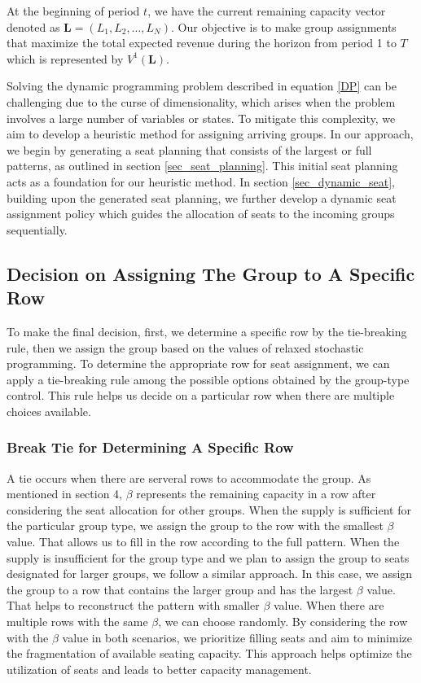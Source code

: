 At the beginning of period $t$, we have the current remaining capacity vector denoted as $\mathbf{L} = (L_1, L_2, \ldots, L_N)$. Our objective is to make group assignments that maximize the total expected revenue during the horizon from period 1 to $T$ which is represented by $V^{1}(\mathbf{L})$.

Solving the dynamic programming problem described in equation \eqref{DP} can be challenging due to the curse of dimensionality, which arises when the problem involves a large number of variables or states. To mitigate this complexity, we aim to develop a heuristic method for assigning arriving groups. In our approach, we begin by generating a seat planning that consists of the largest or full patterns, as outlined in section \ref{sec_seat_planning}. This initial seat planning acts as a foundation for our heuristic method. In section \ref{sec_dynamic_seat}, building upon the generated seat planning, we further develop a dynamic seat assignment policy which guides the allocation of seats to the incoming groups sequentially. 


\subsection{Decision on Assigning The Group to A Specific Row}
To make the final decision, first, we determine a specific row by the tie-breaking rule, then we assign the group based on the values of relaxed stochastic programming. To determine the appropriate row for seat assignment, we can apply a tie-breaking rule among the possible options obtained by the group-type control. This rule helps us decide on a particular row when there are multiple choices available. 

\subsubsection*{Break Tie for Determining A Specific Row}
A tie occurs when there are serveral rows to accommodate the group. As mentioned in section 4, $\beta$ represents the remaining capacity in a row after considering the seat allocation for other groups.
When the supply is sufficient for the particular group type, we assign the group to the row with the smallest $\beta$ value. That allows us to fill in the row according to the full pattern. When the supply is insufficient for the group type and we plan to assign the group to seats designated for larger groups, we follow a similar approach. In this case, we assign the group to a row that contains the larger group and has the largest $\beta$ value. That helps to reconstruct the pattern with smaller $\beta$ value. When there are multiple rows with the same $\beta$, we can choose randomly. By considering the row with the $\beta$ value in both scenarios, we prioritize filling seats and aim to minimize the fragmentation of available seating capacity. This approach helps optimize the utilization of seats and leads to better capacity management.

